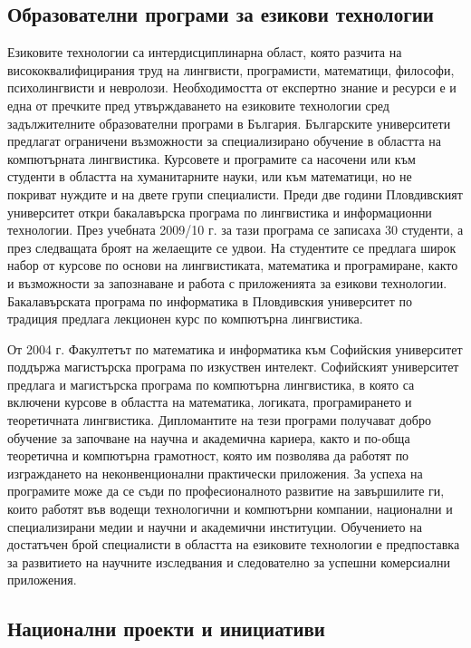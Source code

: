 \begin{multicols}{2}
  \subsection{Образователни програми за езикови технологии}

  Езиковите технологии са интердисциплинарна област, която разчита на висококвалифицирания труд на лингвисти, програмисти, математици, философи, психолингвисти и невролози. Необходимостта от експертно знание и ресурси е и една от пречките пред утвърждаването на езиковите технологии сред задължителните образователни програми в България. 
  Българските университети предлагат ограничени възможности за специализирано
   обучение в областта на компютърната лингвистика.
   Курсовете и програмите са насочени или
   към студенти в областта на хуманитарните науки, или
   към математици, но не покриват нуждите и на двете
   групи специалисти. Преди две години Пловдивският университет откри бакалавърска програма
   по лингвистика и информационни технологии. През
   учебната 2009/10 г. за тази програма се записаха 30
   студенти, а през следващата броят на желаещите се
   удвои. На студентите се предлага широк набор от курсове
   по
   основи
   на
   лингвистиката, математика
   и
   програмиране, както и възможности за запознаване и
   работа с приложенията за езикови технологии.
   Бакалавърската
   програма
   по
   информатика
   в
   Пловдивския университет по традиция предлага
   лекционен курс по компютърна лингвистика.

  От 2004 г. Факултетът по математика и информатика към Софийския университет поддържа магистърска програма
   по
   изкуствен
   интелект.
   Софийският университет предлага и магистърска програма по компютърна лингвистика, в която са включени курсове в
   областта на математика, логиката, програмирането и
   теоретичната лингвистика. Дипломантите на тези програми получават добро
   обучение за започване на научна и академична кариера,
   както и по-обща теоретична и компютърна грамотност,
   която им позволява да работят по изграждането на
   неконвенционални практически приложения. За успеха
   на програмите може да се съди по професионалното
   развитие на завършилите ги, които работят във водещи
   технологични и компютърни компании, национални и
   специализирани медии и научни и академични
   институции.
  Обучението на достатъчен брой специалисти в областта на езиковите технологии е предпоставка за развитието на научните изследвания и следователно за успешни комерсиални приложения. 

  \subsection{Национални проекти и инициативи}


\end{multicols}
